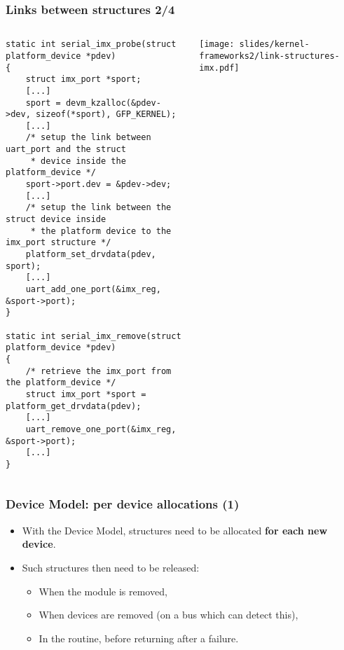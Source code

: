 \begin{frame}[fragile]
  \frametitle{Links between structures 2/4}
  \begin{columns}
    \begin{verbatim}
static int serial_imx_probe(struct platform_device *pdev)
{
    struct imx_port *sport;
    [...]
    sport = devm_kzalloc(&pdev->dev, sizeof(*sport), GFP_KERNEL);
    [...]
    /* setup the link between uart_port and the struct
     * device inside the platform_device */
    sport->port.dev = &pdev->dev;
    [...]
    /* setup the link between the struct device inside
     * the platform device to the imx_port structure */
    platform_set_drvdata(pdev, sport);
    [...]
    uart_add_one_port(&imx_reg, &sport->port);
}

static int serial_imx_remove(struct platform_device *pdev)
{
    /* retrieve the imx_port from the platform_device */
    struct imx_port *sport = platform_get_drvdata(pdev);
    [...]
    uart_remove_one_port(&imx_reg, &sport->port);
    [...]
}
    \end{verbatim}
    \begin{center}
      \texttt{[image: slides/kernel-frameworks2/link-structures-imx.pdf]}
    \end{center}
  \end{columns}
\end{frame}

\begin{frame}
  \frametitle{Device Model: per device allocations (1)}
  \begin{itemize}
  \item With the Device Model, structures need to be allocated
  {\bf for each new device}.
  \item Such structures then need to be released:
  \begin{itemize}
	\item When the module is removed,
	\item When devices are removed (on a bus
 	      which can detect this),
	\item In the  routine, before
	      returning after a failure.
  \end{itemize}
  \end{itemize}
\end{frame}

